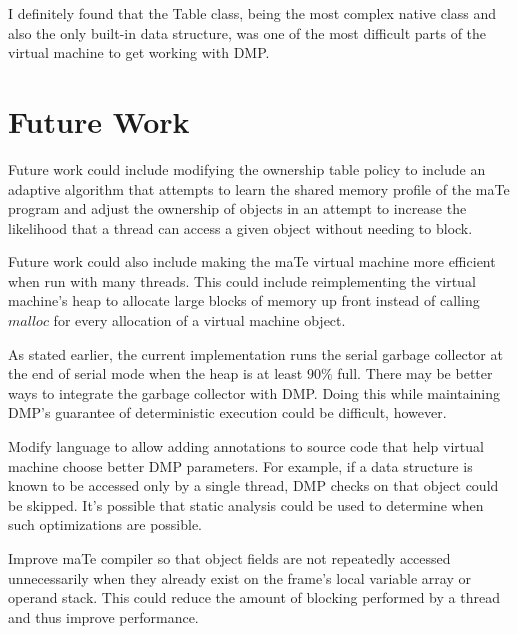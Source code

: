 
I definitely found that the Table class, being the most complex native
class and also the only built-in data structure, was one of the most
difficult parts of the virtual machine to get working with DMP.

\section{Future Work}

Future work could include modifying the ownership table policy to
include an adaptive algorithm that attempts to learn the shared memory
profile of the maTe program and adjust the ownership of objects in an
attempt to increase the likelihood that a thread can access a given
object without needing to block.

Future work could also include making the maTe virtual machine more
efficient when run with many threads.  This could include
reimplementing the virtual machine's heap to allocate large blocks of
memory up front instead of calling $malloc$ for every allocation of a
virtual machine object.

As stated earlier, the current implementation runs the serial garbage
collector at the end of serial mode when the heap is at least $90\%$
full.  There may be better ways to integrate the garbage collector
with DMP.  Doing this while maintaining DMP's guarantee of
deterministic execution could be difficult, however.

Modify language to allow adding annotations to source code that help
virtual machine choose better DMP parameters.  For example, if a data
structure is known to be accessed only by a single thread, DMP checks
on that object could be skipped.  It's possible that static analysis
could be used to determine when such optimizations are possible.

Improve maTe compiler so that object fields are not repeatedly
accessed unnecessarily when they already exist on the frame's local
variable array or operand stack.  This could reduce the amount of
blocking performed by a thread and thus improve performance.

